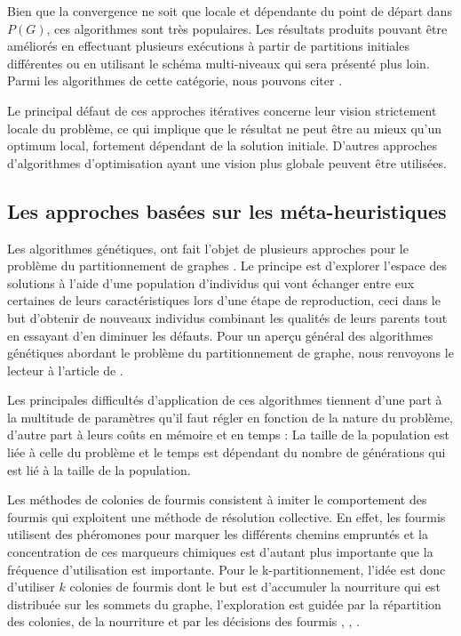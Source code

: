 Bien que la convergence ne soit que locale et dépendante du point de départ dans $P(G)$, ces algorithmes sont très populaires. Les résultats produits pouvant être améliorés en effectuant plusieurs exécutions à partir de partitions initiales différentes ou en utilisant le schéma multi-niveaux qui sera présenté plus loin. Parmi les algorithmes de cette catégorie, nous pouvons citer \citep{FiducciaMattheyses1988,Hagen1997,KernighanLin1970,Krishnamurthy1984}. 

Le principal défaut de ces approches itératives concerne leur vision strictement locale du problème, ce qui implique que le résultat ne peut être au mieux qu'un optimum local, fortement dépendant de la solution initiale. D'autres approches d'algorithmes d'optimisation ayant une vision plus globale peuvent être utilisées.

\subsection*{Les approches basées sur les méta-heuristiques}
 Les algorithmes génétiques, ont fait l'objet de plusieurs approches pour le problème du partitionnement de graphes \citep{BuiMoon1996,ChevalierPellegrini2006,ChockalingamArunkumar1992,Soper2004,TalbiBessiere1991}.  Le principe est d'explorer l’espace des solutions à l'aide d'une population d'individus qui vont échanger entre eux certaines de leurs caractéristiques lors d'une étape de reproduction, ceci dans le but d'obtenir de nouveaux individus combinant les qualités de leurs parents tout en essayant d'en diminuer les défauts. Pour un aperçu général des algorithmes génétiques abordant le problème du partitionnement de graphe, nous renvoyons le lecteur à l'article de \citep{Kim2011}.

Les principales difficultés d'application de ces algorithmes tiennent d'une part à la multitude de paramètres qu'il faut régler en fonction de la nature du problème, d'autre part à leurs coûts en mémoire et en temps : La taille de la population est liée à celle du problème et le temps est dépendant du nombre de générations qui est lié à la taille de la population.

Les méthodes de colonies de fourmis consistent à imiter le comportement des fourmis qui exploitent une méthode de résolution collective. En effet, les fourmis utilisent des phéromones pour marquer les différents chemins empruntés et la concentration de ces marqueurs chimiques est
d'autant plus importante que la fréquence d'utilisation est importante. Pour le k-partitionnement, l'idée est donc d'utiliser $k$ colonies de fourmis dont le but est d'accumuler la nourriture qui est distribuée sur les sommets du graphe, l'exploration est guidée par la répartition des colonies, de la nourriture et par les décisions des fourmis \citep{Korosec2004}, \citep{LanghamGrant1999}, \citep{Jovanovic2016}.


